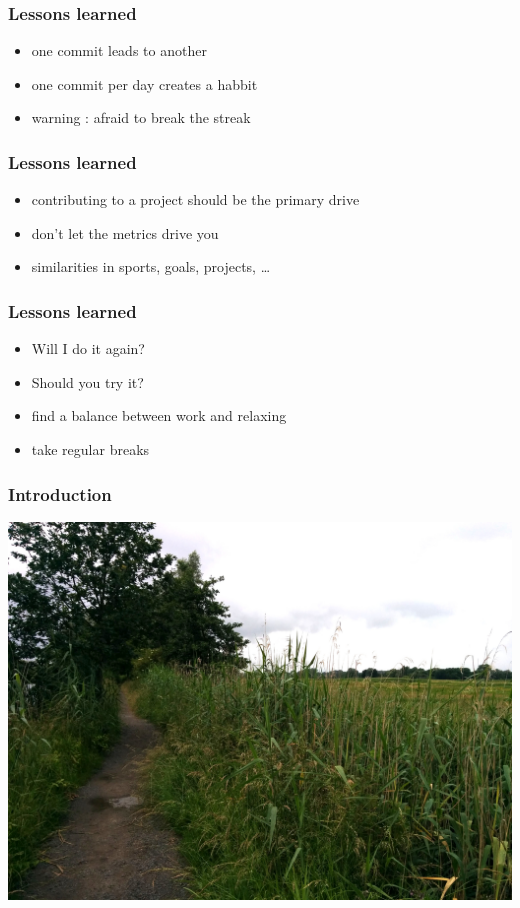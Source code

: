 \documentclass[14pt]{beamer}
\begin{document}
  \begin{frame}
    \frametitle{Lessons learned}
    \begin{itemize}
      \item one commit leads to another
      \item one commit per day creates a habbit
      \item warning : afraid to break the streak
    \end{itemize}
  \end{frame}
  \begin{frame}
    \frametitle{Lessons learned}
    \begin{itemize}
      \item contributing to a project should be the primary drive
      \item don't let the metrics drive you
      \item similarities in sports, goals, projects, \ldots
    \end{itemize}
  \end{frame}
  \begin{frame}
    \frametitle{Lessons learned}
    \begin{itemize}
      \item Will I do it again?
      \item Should you try it?
      \item find a balance between work and relaxing
      \item take regular breaks
    \end{itemize}
  \end{frame}
  \begin{frame}
    \frametitle{Introduction}
    \includegraphics[scale=.1]{Bourgoyen.jpg}
  \end{frame}
\end{document}
